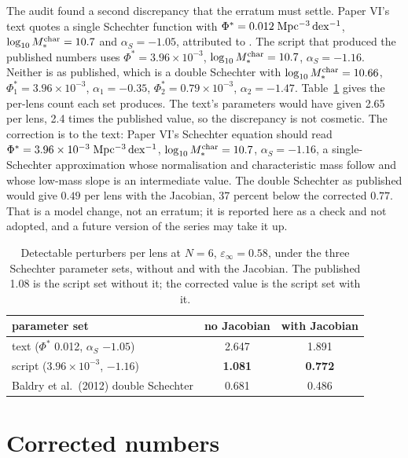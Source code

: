 \documentclass[twocolumn,11pt]{article}
\newcommand{\einf}{\varepsilon_\infty}
\begin{document}
The audit found a second discrepancy that the erratum must settle.
Paper VI's text quotes a single Schechter function with
$\Phi^\ast=0.012\;{\rm Mpc^{-3}\,dex^{-1}}$,
$\log_{10}M_\ast^{\rm char}=10.7$ and $\alpha_S=-1.05$, attributed to
\citet{baldry12}. The script that produced the published numbers uses
$\Phi^\ast=3.96\times10^{-3}$, $\log_{10}M_\ast^{\rm char}=10.7$,
$\alpha_S=-1.16$. Neither is \citet{baldry12} as published, which is a
double Schechter with $\log_{10}M_\ast^{\rm char}=10.66$,
$\Phi_1^\ast=3.96\times10^{-3}$, $\alpha_1=-0.35$,
$\Phi_2^\ast=0.79\times10^{-3}$, $\alpha_2=-1.47$. Table~\ref{tab:schechter}
gives the per-lens count each set produces. The text's parameters
would have given 2.65 per lens, 2.4 times the published value, so the
discrepancy is not cosmetic. The correction is to the text: Paper VI's
Schechter equation should read $\Phi^\ast=3.96\times10^{-3}\;{\rm Mpc^{-3}\,dex^{-1}}$,
$\log_{10}M_\ast^{\rm char}=10.7$, $\alpha_S=-1.16$, a single-Schechter
approximation whose normalisation and characteristic mass follow
\citet{baldry12} and whose low-mass slope is an intermediate value.
The double Schechter as published would give $0.49$ per lens with the
Jacobian, 37 percent below the corrected $0.77$. That is a model change,
not an erratum; it is reported here as a check and not adopted, and a
future version of the series may take it up.

\begin{table}
\centering
\caption{Detectable perturbers per lens at $N=6$, $\einf=0.58$, under
the three Schechter parameter sets, without and with the Jacobian. The
published 1.08 is the script set without it; the corrected value is
the script set with it.}
\label{tab:schechter}
\small
\begin{tabular}{lcc}
\toprule
parameter set & no Jacobian & with Jacobian \\
\midrule
text ($\Phi^\ast$ 0.012, $\alpha_S$ $-1.05$)        & 2.647 & 1.891 \\
script ($3.96\times10^{-3}$, $-1.16$)               & \textbf{1.081} & \textbf{0.772} \\
Baldry et al.\ (2012) double Schechter              & 0.681 & 0.486 \\
\bottomrule
\end{tabular}
\end{table}

\section{Corrected numbers}
\label{sec:numbers}
\end{document}
